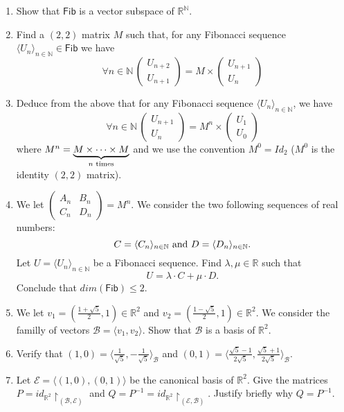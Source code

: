 \documentclass{article}
\begin{document}
\begin{enumerate}
\item Show that $\textsf{Fib}$ is a vector subspace of $\mathbb{R}^{\mathbb{N}}$.
\item Find a $(2,2)$ matrix $M$ such that, for any Fibonacci sequence $\langle U_n \rangle_{n \in \mathbb{N}} \in \textsf{Fib}$ we have \[\forall n \in \mathbb{N}\, \begin{pmatrix} U_{n+2} \\ U_{n+1} \end{pmatrix} = M \times \begin{pmatrix} U_{n+1} \\ U_{n} \end{pmatrix}  \]
\item Deduce from the above that for any Fibonacci sequence $\langle U_n \rangle_{n \in \mathbb{N}}$, we have  \[ \forall n \in  \mathbb{N}\,\begin{pmatrix} U_{n+1} \\ U_n \end{pmatrix} = M^n \times \begin{pmatrix} U_{1} \\ U_{0} \end{pmatrix}\] where $M^n = \underbrace{M \times \dots \times M}_{n \textnormal{ times}}$ and we use the convention $M^0 = Id_{2}$ ($M^0$ is the identity $(2,2)$ matrix).
\item We let $\begin{pmatrix} A_n & B_n\\C_n & D_n \end{pmatrix} = M^n$. We consider the two following sequences of real numbers:
  \[ C = \langle C_n \rangle_{n \in \mathbb{N}} \textnormal{ and } D = \langle D_n \rangle_{n \in \mathbb{N}}.\] Let $U = \langle U_n \rangle_{n \in \mathbb{N}}$ be a Fibonacci sequence. Find $\lambda, \mu \in \mathbb{R}$ such that
  \[ U = \lambda \cdot C + \mu \cdot D. \] Conclude that $dim(\textsf{Fib}) \le 2$.
\item We let $v_1 = (\frac{1 + \sqrt{5}}{2}, 1) \in \mathbb{R}^2$ and $v_2 = (\frac{1-\sqrt{5}}{2}, 1) \in \mathbb{R}^2$. We consider the familly of vectors $\mathcal{B} = \langle v_1, v_2 \rangle$. Show that $\mathcal{B}$ is a basis of $\mathbb{R}^2$.
\item Verify that $(1, 0) = \langle \frac{1}{\sqrt{5}}, -\frac{1}{\sqrt{5}} \rangle_{\mathcal{B}}$ and $(0, 1) = \langle \frac{\sqrt{5}-1}{2\sqrt{5}}, \frac{\sqrt{5} + 1}{2\sqrt{5}}  \rangle_{\mathcal{B}}$.
\item Let $\mathcal{E} = \langle (1,0), (0,1) \rangle$ be the canonical basis of $\mathbb{R}^{2}$. Give the matrices $P = id_{\mathbb{R}^2} \restriction_{(\mathcal{B}, \mathcal{E})}$ and $Q = P^{-1} = id_{\mathbb{R}^2} \restriction_{(\mathcal{E}, \mathcal{B})}$. Justify briefly why $Q = P^{-1}$.

\end{enumerate}
\end{document}
